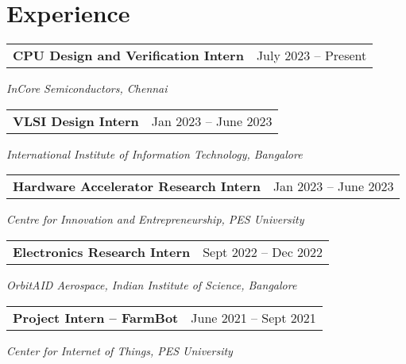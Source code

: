 \section{\sc Experience}

\begin{tabular}{@{}p{4in}p{2in}}
{\bf{CPU Design and Verification Intern}}  & July 2023 – Present \\
\end{tabular}  
    \textit{InCore Semiconductors, Chennai} 

   
   \begin{tabular}{@{}p{4in}p{2in}}
    {\bf{VLSI Design Intern}} & Jan 2023 – June 2023 \\
   \end{tabular}
   \textit{International Institute of Information Technology, Bangalore}  


   \begin{tabular}{@{}p{4in}p{2in}}
    {\bf{Hardware Accelerator Research Intern}}  & Jan 2023 – June 2023 \\
   \end{tabular}
   \textit{Centre for Innovation and Entrepreneurship, PES University} 

   \begin{tabular}{@{}p{4in}p{2in}}
    {\bf{Electronics Research Intern}} & Sept 2022 – Dec 2022 \\
   \end{tabular}
   \textit{OrbitAID Aerospace, Indian Institute of Science, Bangalore}  

   \begin{tabular}{@{}p{4in}p{2in}}
   {\bf{Project Intern – FarmBot}} & June 2021 – Sept 2021 \\
   \end{tabular}
   \textit{Center for Internet of Things, PES University}  

   \endinput